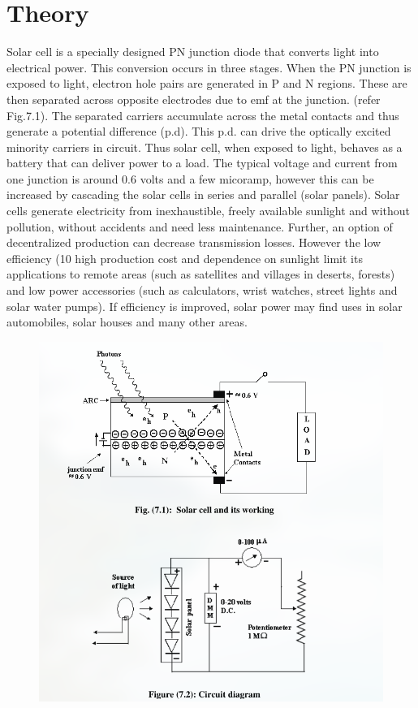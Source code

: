 \documentclass[12pt]{article}
\begin{document}
\section{Theory}
Solar cell is a specially designed PN junction diode that converts light into electrical
power. This conversion occurs in three stages. When the PN junction is exposed to light, electron
	hole pairs are generated in P and N regions. These are then separated across opposite electrodes
	due to emf at the junction. (refer Fig.7.1). The separated carriers accumulate across the metal
	contacts and thus generate a potential difference (p.d). This p.d. can drive the optically excited
	minority carriers in circuit. Thus solar cell, when exposed to light, behaves as a battery that can
	deliver power to a load. The typical voltage and current from one junction is around 0.6 volts and
	a few micoramp, however this can be increased by cascading the solar cells in series and parallel
	(solar panels). Solar cells generate electricity from inexhaustible, freely available sunlight and
	without pollution, without accidents and need less maintenance. Further, an option of
	decentralized production can decrease transmission losses. However the low efficiency (10%
	high production cost and dependence on sunlight limit its applications to remote areas (such as
	satellites and villages in deserts, forests) and low power accessories (such as calculators, wrist
	watches, street lights and solar water pumps). If efficiency is improved, solar power may find
	uses in solar automobiles, solar houses and many other areas.
	\begin{figure}[H]
		\centering
		\includegraphics[scale=0.8]{thoeryfi.png}
		\label{it}
	\end{figure}
\end{document}
